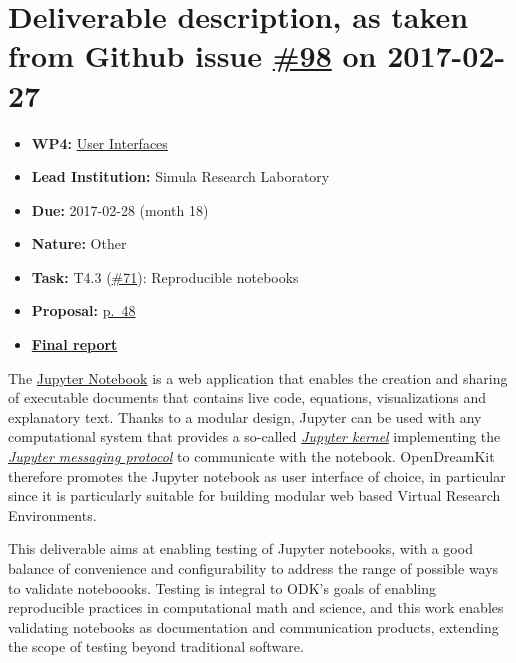 \section*{\texorpdfstring{Deliverable description, as taken from Github
issue
\href{https://github.com/OpenDreamKit/OpenDreamKit/issues/98}{\#98} on
2017-02-27}{Deliverable description, as taken from Github issue \#98 on 2017-02-27}}\label{deliverable-description-as-taken-from-github-issue-98-on-2017-02-27}

\begin{itemize}
\tightlist
\item
  \textbf{WP4:}
  \href{https://github.com/OpenDreamKit/OpenDreamKit/tree/master/WP4}{User
  Interfaces}
\item
  \textbf{Lead Institution:} Simula Research Laboratory
\item
  \textbf{Due:} 2017-02-28 (month 18)
\item
  \textbf{Nature:} Other
\item
  \textbf{Task:} T4.3
  (\href{https://github.com/OpenDreamKit/OpenDreamKit/issues/71}{\#71}):
  Reproducible notebooks
\item
  \textbf{Proposal:}
  \href{https://github.com/OpenDreamKit/OpenDreamKit/raw/master/Proposal/proposal-www.pdf}{p.~48}
\item
  \textbf{\href{https://github.com/OpenDreamKit/OpenDreamKit/raw/master/WP4/D4.8/report-final.pdf}{Final
  report}}
\end{itemize}

The \href{https://jupyter.org}{Jupyter Notebook} is a web application
that enables the creation and sharing of executable documents that
contains live code, equations, visualizations and explanatory text.
Thanks to a modular design, Jupyter can be used with any computational
system that provides a so-called
\href{https://jupyter.readthedocs.io/en/latest/projects/kernels.html}{\emph{Jupyter
kernel}} implementing the
\href{https://jupyter-client.readthedocs.io/en/latest/}{\emph{Jupyter
messaging protocol}} to communicate with the notebook. OpenDreamKit
therefore promotes the Jupyter notebook as user interface of choice, in
particular since it is particularly suitable for building modular web
based Virtual Research Environments.

This deliverable aims at enabling testing of Jupyter notebooks, with a
good balance of convenience and configurability to address the range of
possible ways to validate noteboooks. Testing is integral to ODK's goals
of enabling reproducible practices in computational math and science,
and this work enables validating notebooks as documentation and
communication products, extending the scope of testing beyond
traditional software.

